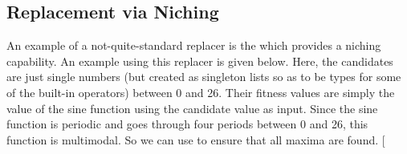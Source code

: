 \documentclass[letterpaper,10pt,english]{sphinxmanual}
\begin{document}
\subsection{Replacement via Niching}
\label{examples:replacement-via-niching}
An example of a not-quite-standard replacer is the  which
provides a niching capability. An example using this replacer is given below. Here,
the candidates are just single numbers (but created as singleton lists so as to
be  types for some of the built-in operators) between 0 and 26. Their
fitness values are simply the value of the sine function using the candidate value
as input. Since the sine function is periodic and goes through four periods between
0 and 26, this function is multimodal. So we can use  to
ensure that all maxima are found.
{[}\code{download}{]}
\end{document}
